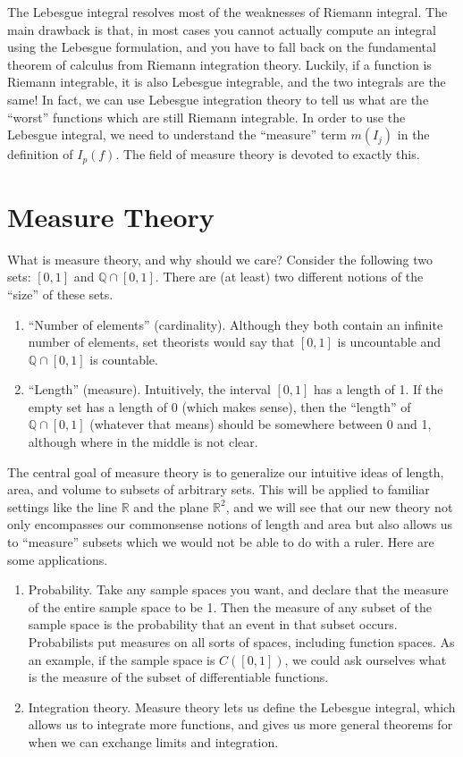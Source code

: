 \documentclass[12pt]{amsart}         %
\theoremstyle{remark}
\newcommand{\R}{\mathbb{R}}
\newcommand{\Q}{\mathbb{Q}}
\begin{document}
The Lebesgue integral resolves most of the weaknesses of Riemann integral. The main drawback is that, in most cases you cannot actually compute an integral using the Lebesgue formulation, and you have to fall back on the fundamental theorem of calculus from Riemann integration theory. Luckily, if a function is Riemann integrable, it is also Lebesgue integrable, and the two integrals are the same! In fact, we can use Lebesgue integration theory to tell us what are the ``worst'' functions which are still Riemann integrable. In order to use the Lebesgue integral, we need to understand the ``measure'' term $m(I_j)$ in the definition of $I_p(f)$. The field of measure theory is devoted to exactly this.

\section{Measure Theory}

What is measure theory, and why should we care? Consider the following two sets: $[0, 1]$ and $\Q \cap [0, 1]$. There are (at least) two different notions of the ``size'' of these sets.
\begin{enumerate}
    \item ``Number of elements'' (cardinality). Although they both contain an infinite number of elements, set theorists would say that $[0, 1]$ is uncountable and $\Q \cap [0, 1]$ is countable. 
    \item ``Length'' (measure). Intuitively, the interval $[0, 1]$ has a length of 1. If the empty set has a length of 0 (which makes sense), then the ``length'' of $\Q \cap [0, 1]$ (whatever that means) should be somewhere between 0 and 1, although where in the middle is not clear.
\end{enumerate}

The central goal of measure theory is to generalize our intuitive ideas of length, area, and volume to subsets of arbitrary sets. This will be applied to familiar settings like the line $\R$ and the plane $\R^2$, and we will see that our new theory not only encompasses our commonsense notions of length and area but also allows us to ``measure'' subsets which we would not be able to do with a ruler. Here are some applications.

\begin{enumerate}
	\item Probability. Take any sample spaces you want, and declare that the measure of the entire sample space to be 1. Then the measure of any subset of the sample space is the probability that an event in that subset occurs. Probabilists put measures on all sorts of spaces, including function spaces. As an example, if the sample space is $C([0, 1])$, we could ask ourselves what is the measure of the subset of differentiable functions.

	\item Integration theory. Measure theory lets us define the Lebesgue integral, which allows us to integrate more functions, and gives us more general theorems for when we can exchange limits and integration.
\end{enumerate}
\end{document}
